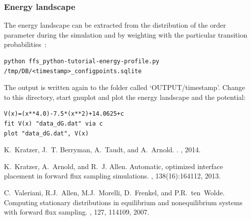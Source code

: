 \documentclass[a4paper,oneside]{article}
\newenvironment{mylisting}
{\begin{list}{}{\setlength{\leftmargin}{1em}}\item\scriptsize\bfseries}
{\end{list}}
\begin{document}
\subsubsection{Energy landscape}
The energy landscape can be extracted from the distribution of the order parameter during the simulation and by weighting with the particular transition probabilities~\cite{stadist}:
\begin{mylisting}
\begin{verbatim}
python ffs_python-tutorial-energy-profile.py /tmp/DB/<timestamp>_configpoints.sqlite
\end{verbatim}
\end{mylisting}
The output is written again to the folder called `OUTPUT/timestamp'. Change to this directory, start gnuplot and plot the energy landscape and the potential:
\begin{mylisting}
\begin{verbatim}
V(x)=(x**4.0)-7.5*(x**2)+14.0625+c
fit V(x) "data_dG.dat" via c
plot "data_dG.dat", V(x)
\end{verbatim}
\end{mylisting}


\begin{thebibliography}{1}

K.~Kratzer, J.~T. Berryman, A.~Taudt, and A.~Arnold.
.
, 2014.

K.~Kratzer, A.~Arnold, and R.~J. Allen.
\newblock Automatic, optimized interface placement in forward flux sampling
  simulations.
, 138(16):164112, 2013.

C.~Valeriani, R.J.~Allen, M.J.~Morelli, D.~Frenkel, and P.R.~ten~Wolde.
\newblock Computing stationary distributions in equilibrium and nonequilibrium systems with forward flux sampling.
, 127, 114109, 2007.

\end{thebibliography}
\end{document}
